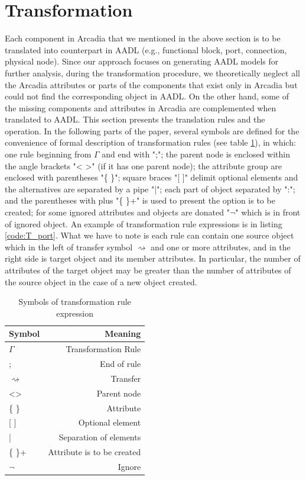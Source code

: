 \section{Transformation}\label{sec:trans}
Each component in Arcadia that we mentioned in the above section is to be translated into counterpart in AADL (e.g., functional block, port, connection, physical node). Since our approach focuses on generating AADL models for further analysis, during the transformation procedure, we theoretically neglect all the Arcadia attributes or parts of the components that exist only in Arcadia but could not find the corresponding object in AADL. On the other hand, some of the missing components and attributes in Arcadia are complemented when translated to AADL. This section presents the translation rules and the operation. In the following parts of the paper, several symbols are defined for the convenience of formal description of transformation rules (see table \ref{tab:symbol}), in which: one rule beginning from $\Gamma$ and end with ";"; the parent node is enclosed within the angle brackets "< >" (if it has one parent node); the attribute group are enclosed with parentheses "\{ \}"; square braces "[ ]" delimit optional elements and the alternatives are separated by a pipe "|"; each part of object separated by ":"; and the parentheses with plus "\{ \}+" is used to present the option is to be created; for some ignored attributes and objects are donated "$\neg$" which is in front of ignored object. An example of transformation rule expressions is in listing \ref{code:T_port}. What we have to note is each rule can contain one source object which in the left of transfer symbol $\rightsquigarrow$ and one or more attributes, and in the right side is target object and its member attributes. In particular, the number of attributes of the target object may be greater than the number of attributes of the source object in the case of a new object created.%



\begin{table}[h] 
\centering
\normalsize
\begin{tabular}{lr}
\hline
\textbf{Symbol} & \textbf{Meaning} \\ \hline 
$\Gamma$ & Transformation Rule \\ 
; & End of rule \\ 
$\rightsquigarrow$ & Transfer \\
\textless \textgreater{} & Parent node \\ 
\{ \} & Attribute \\ 
{[} {]} & Optional element \\ 
| & Separation of elements  \\
\{ \}+ & Attribute is to be created \\ 
$\neg$ & Ignore \\ \hline
\end{tabular}
\vskip 0.5cm
\caption{Symbols of transformation rule expression}
\label{tab:symbol}
\end{table}

